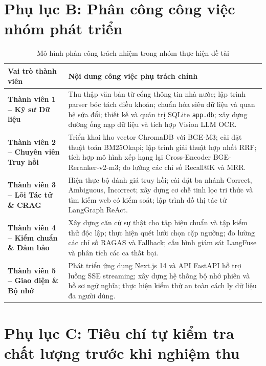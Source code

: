 \section{Phụ lục B: Phân công công việc nhóm phát triển}

\begin{table}[htbp]
\centering
\caption{Mô hình phân công trách nhiệm trong nhóm thực hiện đề tài}
\label{tab:team_roles}
\renewcommand{\arraystretch}{1.25}
\begin{tabularx}{\textwidth}{L{4.2cm} Y}
\toprule
{}\color{white}\textbf{Vai trò thành viên} & \color{white}\textbf{Nội dung công việc phụ trách chính} \\
\midrule
\textbf{Thành viên 1 -- Kỹ sư Dữ liệu} & Thu thập văn bản từ cổng thông tin nhà nước; lập trình parser bóc tách điều khoản; chuẩn hóa siêu dữ liệu và quan hệ sửa đổi; thiết kế và quản trị SQLite \texttt{app.db}; xây dựng đường ống nạp dữ liệu và tích hợp Vision LLM OCR. \\
\textbf{Thành viên 2 -- Chuyên viên Truy hồi} & Triển khai kho vector ChromaDB với BGE-M3; cài đặt thuật toán BM25Okapi; lập trình giải thuật hợp nhất RRF; tích hợp mô hình xếp hạng lại Cross-Encoder BGE-Reranker-v2-m3; đo lường các chỉ số Recall@K và MRR. \\
\textbf{Thành viên 3 -- Lõi Tác tử \& CRAG} & Hiện thực bộ đánh giá truy hồi; cài đặt ba nhánh Correct, Ambiguous, Incorrect; xây dựng cơ chế tinh lọc tri thức và tìm kiếm web có kiểm soát; lập trình đồ thị tác tử LangGraph ReAct. \\
\textbf{Thành viên 4 -- Kiểm chuẩn \& Đảm bảo} & Xây dựng căn cứ sự thật cho tập hiệu chuẩn và tập kiểm thử độc lập; thực hiện quét lưới chọn cặp ngưỡng; đo lường các chỉ số RAGAS và Fallback; cấu hình giám sát LangFuse và phân tích các ca thất bại. \\
\textbf{Thành viên 5 -- Giao diện \& Bộ nhớ} & Phát triển ứng dụng Next.js 14 và API FastAPI hỗ trợ luồng SSE streaming; xây dựng hệ thống bộ nhớ phiên và hồ sơ ngữ nghĩa; thực hiện kiểm thử an toàn cách ly dữ liệu đa người dùng. \\
\bottomrule
\end{tabularx}
\end{table}

\section{Phụ lục C: Tiêu chí tự kiểm tra chất lượng trước khi nghiệm thu}

